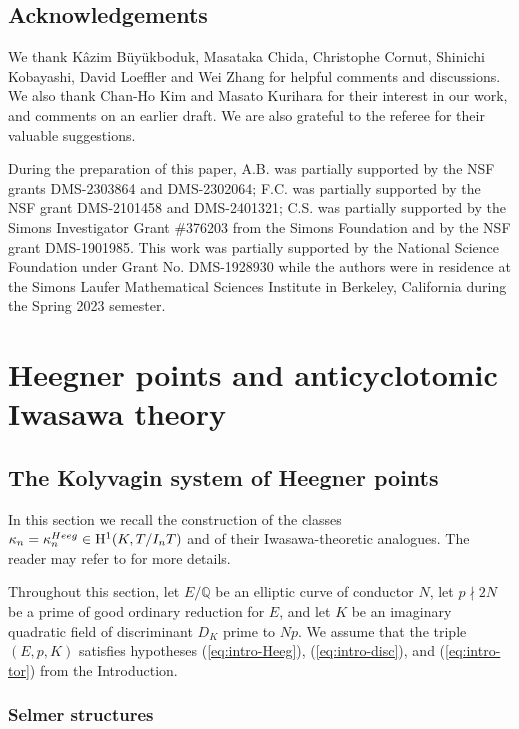 \documentclass[10pt,reqno]{amsart}
\numberwithin{equation}{section}
\theoremstyle{plain}
\theoremstyle{definition}
\theoremstyle{definition}
\theoremstyle{plain}
\theoremstyle{plain}
\theoremstyle{plain}
\theoremstyle{plain}
\theoremstyle{plain}
\theoremstyle{plain}
\newcommand{\Q}{\mathbb{Q}}
\newcommand{\rH}{\mathrm{H}}
\begin{document}
\subsection*{Acknowledgements}
We thank K\^{a}zim Büy\"{u}kboduk, Masataka Chida, Christophe Cornut, Shinichi Kobayashi, David Loeffler and Wei Zhang for helpful comments and discussions.  
We also thank Chan-Ho Kim and Masato Kurihara  
for their interest in our work, and comments on an earlier draft. We are also grateful to the referee for their valuable suggestions. 

During the preparation of this paper, 
A.B. was partially supported by the NSF grants DMS-2303864 and DMS-2302064;
F.C. was partially supported by the NSF grant 
DMS-2101458 and DMS-2401321; C.S. was partially supported by the Simons Investigator Grant \#376203 from the Simons Foundation and by the NSF grant DMS-1901985. This work was partially supported by the National Science Foundation under Grant No. DMS-1928930 while the authors were in residence at the Simons Laufer Mathematical Sciences %
Institute in Berkeley, California during the Spring 2023 semester.



\section{Heegner points and anticyclotomic Iwasawa theory}\label{s:Heegner}
\subsection{The Kolyvagin system of Heegner points}
\label{subsec:KS-Heeg}

In this section we recall the construction of the classes $\kappa_{n}=\kappa_{n}^{\rm Heeg}\in \rH^1(K,T/I_nT)$ and of their Iwasawa-theoretic analogues. The reader may refer to \cite[$\S$1.7,~$\S$2.3]{howard} for more details. 

Throughout this section, let $E/\Q$ be an elliptic curve of conductor $N$, let $p\nmid 2N$ be a prime of good ordinary reduction for $E$, and let $K$ be an imaginary quadratic field of discriminant $D_K$  prime to $Np$. We assume that the triple $(E,p,K)$ satisfies hypotheses (\ref{eq:intro-Heeg}), (\ref{eq:intro-disc}), and (\ref{eq:intro-tor}) from the Introduction. 
\subsubsection{Selmer structures}\label{secsel}
\end{document}
